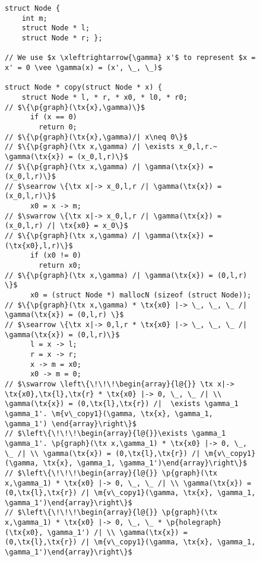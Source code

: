 \begin{figure}
  \begin{lstlisting}
struct Node {
    int m;
    struct Node * l;
    struct Node * r; };

// We use $x \xleftrightarrow{\gamma} x'$ to represent $x = x' = 0 \vee \gamma(x) = (x', \_, \_)$

struct Node * copy(struct Node * x) { 
    struct Node * l, * r, * x0, * l0, * r0;
// $\{\p{graph}(\tx{x},\gamma)\}$
      if (x == 0)
        return 0;
// $\{\p{graph}(\tx{x},\gamma)/| x\neq 0\}$
// $\{\p{graph}(\tx x,\gamma) /| \exists x_0,l,r.~ \gamma(\tx{x}) = (x_0,l,r)\}$
// $\{\p{graph}(\tx x,\gamma) /| \gamma(\tx{x}) = (x_0,l,r)\}$
// $\searrow \{\tx x|-> x_0,l,r /| \gamma(\tx{x}) = (x_0,l,r)\}$
      x0 = x -> m;
// $\swarrow \{\tx x|-> x_0,l,r /| \gamma(\tx{x}) = (x_0,l,r) /| \tx{x0} = x_0\}$
// $\{\p{graph}(\tx x,\gamma) /| \gamma(\tx{x}) = (\tx{x0},l,r)\}$
      if (x0 != 0)
        return x0;
// $\{\p{graph}(\tx x,\gamma) /| \gamma(\tx{x}) = (0,l,r) \}$
      x0 = (struct Node *) mallocN (sizeof (struct Node));
// $\{\p{graph}(\tx x,\gamma) * \tx{x0} |-> \_, \_, \_ /| \gamma(\tx{x}) = (0,l,r) \}$
// $\searrow \{\tx x|-> 0,l,r * \tx{x0} |-> \_, \_, \_ /| \gamma(\tx{x}) = (0,l,r)\}$
      l = x -> l;
      r = x -> r;
      x -> m = x0;
      x0 -> m = 0;
// $\swarrow \left\{\!\!\!\begin{array}{l@{}} \tx x|-> \tx{x0},\tx{l},\tx{r} * \tx{x0} |-> 0, \_, \_ /| \\ \gamma(\tx{x}) = (0,\tx{l},\tx{r}) /|  \exists \gamma_1 \gamma_1'. \m{v\_copy1}(\gamma, \tx{x}, \gamma_1, \gamma_1') \end{array}\right\}$
// $\left\{\!\!\!\begin{array}{l@{}}\exists \gamma_1 \gamma_1'. \p{graph}(\tx x,\gamma_1) * \tx{x0} |-> 0, \_, \_ /| \\ \gamma(\tx{x}) = (0,\tx{l},\tx{r}) /| \m{v\_copy1}(\gamma, \tx{x}, \gamma_1, \gamma_1')\end{array}\right\}$
// $\left\{\!\!\!\begin{array}{l@{}} \p{graph}(\tx x,\gamma_1) * \tx{x0} |-> 0, \_, \_ /| \\ \gamma(\tx{x}) = (0,\tx{l},\tx{r}) /| \m{v\_copy1}(\gamma, \tx{x}, \gamma_1, \gamma_1')\end{array}\right\}$
// $\left\{\!\!\!\begin{array}{l@{}} \p{graph}(\tx x,\gamma_1) * \tx{x0} |-> 0, \_, \_ * \p{holegraph}(\tx{x0}, \gamma_1') /| \\ \gamma(\tx{x}) = (0,\tx{l},\tx{r}) /| \m{v\_copy1}(\gamma, \tx{x}, \gamma_1, \gamma_1')\end{array}\right\}$

\end{lstlisting}
\end{figure}
